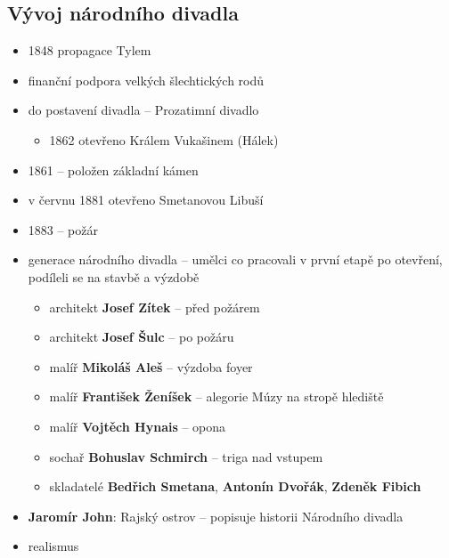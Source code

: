 \subsection{Vývoj národního divadla}
\begin{itemize}
\item 1848 propagace Tylem
\item finanční podpora velkých šlechtických rodů 
\item do postavení divadla -- Prozatimní divadlo
	\begin{itemize}
	\item 1862 otevřeno Králem Vukašinem (Hálek)
	\end{itemize}
\item 1861 -- položen základní kámen
\item v červnu 1881 otevřeno Smetanovou Libuší
\item 1883 -- požár
\item generace národního divadla -- umělci co pracovali v první etapě po otevření, podíleli se na stavbě a výzdobě
	\begin{itemize}
	\item architekt \textbf{Josef Zítek} -- před požárem
	\item architekt \textbf{Josef Šulc} -- po požáru
	\item malíř \textbf{Mikoláš Aleš} -- výzdoba foyer
	\item malíř \textbf{František Ženíšek} -- alegorie Múzy na stropě hlediště
	\item malíř \textbf{Vojtěch Hynais} -- opona
	\item sochař \textbf{Bohuslav Schmirch} -- triga nad vstupem 
	\item skladatelé \textbf{Bedřich Smetana}, \textbf{Antonín Dvořák}, \textbf{Zdeněk Fibich}
	\end{itemize}
\item \textbf{Jaromír John}: Rajský ostrov -- popisuje historii Národního divadla
\item realismus
\end{itemize}

